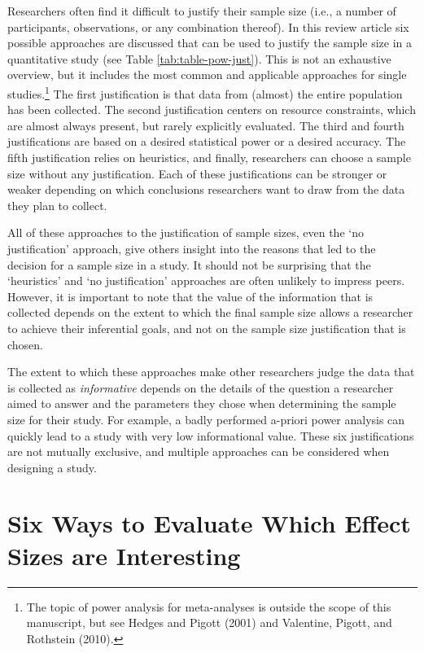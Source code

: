 \documentclass[
  english,
  ,jou,floatsintext]{apa6}
\begin{document}
Researchers often find it difficult to justify their sample size (i.e., a number of participants, observations, or any combination thereof). In this review article six possible approaches are discussed that can be used to justify the sample size in a quantitative study (see Table \ref{tab:table-pow-just}). This is not an exhaustive overview, but it includes the most common and applicable approaches for single studies.\footnote{The topic of power analysis for meta-analyses is outside the scope of this manuscript, but see Hedges and Pigott (2001) and Valentine, Pigott, and Rothstein (2010).} The first justification is that data from (almost) the entire population has been collected. The second justification centers on resource constraints, which are almost always present, but rarely explicitly evaluated. The third and fourth justifications are based on a desired statistical power or a desired accuracy. The fifth justification relies on heuristics, and finally, researchers can choose a sample size without any justification. Each of these justifications can be stronger or weaker depending on which conclusions researchers want to draw from the data they plan to collect.

All of these approaches to the justification of sample sizes, even the `no justification' approach, give others insight into the reasons that led to the decision for a sample size in a study. It should not be surprising that the `heuristics' and `no justification' approaches are often unlikely to impress peers. However, it is important to note that the value of the information that is collected depends on the extent to which the final sample size allows a researcher to achieve their inferential goals, and not on the sample size justification that is chosen.

The extent to which these approaches make other researchers judge the data that is collected as \emph{informative} depends on the details of the question a researcher aimed to answer and the parameters they chose when determining the sample size for their study. For example, a badly performed a-priori power analysis can quickly lead to a study with very low informational value. These six justifications are not mutually exclusive, and multiple approaches can be considered when designing a study.

\hypertarget{six-ways-to-evaluate-which-effect-sizes-are-interesting}{%
\section{Six Ways to Evaluate Which Effect Sizes are Interesting}\label{six-ways-to-evaluate-which-effect-sizes-are-interesting}}
\end{document}
